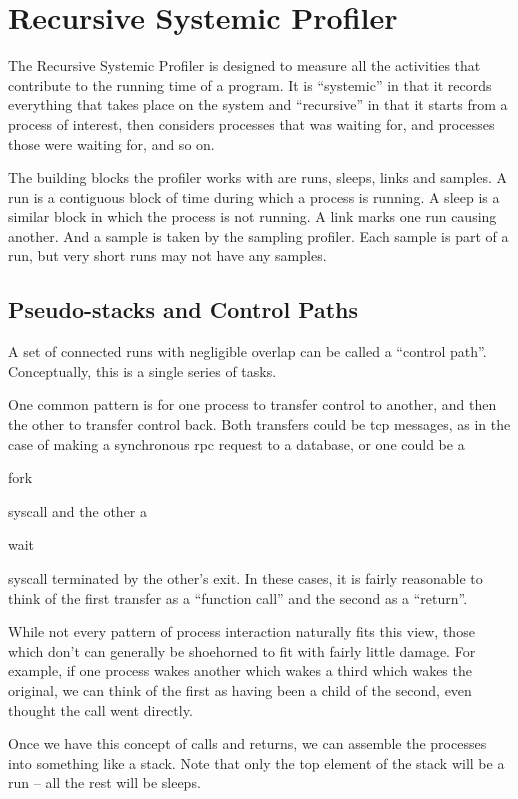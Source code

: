 \documentclass[10pt]{article}
\begin{document}
\section{Recursive Systemic Profiler}

The Recursive Systemic Profiler is designed to measure all the activities that contribute to the running time of a program.  It is ``systemic'' in that it records everything that takes place on the system and ``recursive'' in that it starts from a process of interest, then considers processes that was waiting for, and processes those were waiting for, and so on.

The building blocks the profiler works with are runs, sleeps, links and samples.  A run is a contiguous block of time during which a process is running.  A sleep is a similar block in which the process is not running.  A link marks one run causing another.  And a sample is taken by the sampling profiler.  Each sample is part of a run, but very short runs may not have any samples.

\subsection{Pseudo-stacks and Control Paths}

A set of connected runs with negligible overlap can be called a ``control path''.  Conceptually, this is a single series of tasks.

One common pattern is for one process to transfer control to another, and then the other to transfer control back.  Both transfers could be tcp messages, as in the case of making a synchronous rpc request to a database, or one could be a \begin{tt}fork\end{tt} syscall and the other a \begin{tt}wait\end{tt} syscall terminated by the other's exit.  In these cases, it is fairly reasonable to think of the first transfer as a ``function call'' and the second as a ``return''.

While not every pattern of process interaction naturally fits this view, those which don't can generally be shoehorned to fit with fairly little damage.  For example, if one process wakes another which wakes a third which wakes the original, we can think of the first as having been a child of the second, even thought the call went directly.

Once we have this concept of calls and returns, we can assemble the processes into something like a stack.  Note that only the top element of the stack will be a run -- all the rest will be sleeps.
\end{document}
